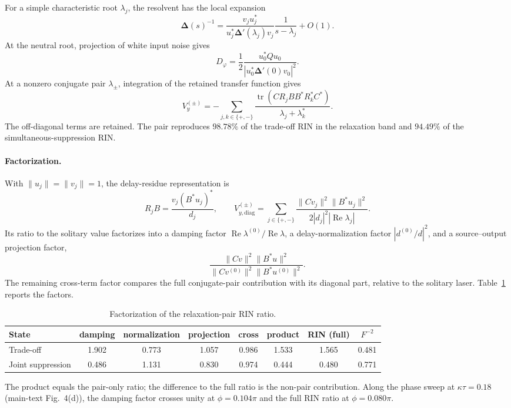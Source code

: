 \documentclass[11pt]{article}
\newcommand{\Dmat}{\bm{\Delta}}
\newcommand{\Tr}{\operatorname{tr}}
\newif\ifmarked
\newenvironment{revised}{\ifmarked\color{blue}\fi}{}
\begin{document}
For a simple characteristic root $\lambda_j$, the resolvent has the local expansion
\begin{equation}
\Dmat(s)^{-1}=\frac{v_ju_j^*}{u_j^*\Dmat'(\lambda_j)v_j}\frac{1}{s-\lambda_j}+O(1).
\end{equation}
At the neutral root, projection of white input noise gives
\begin{equation}
D_\varphi=\frac12\frac{u_0^*Qu_0}{|u_0^*\Dmat'(0)v_0|^2}.
\end{equation}
At a nonzero conjugate pair $\lambda_\pm$, integration of the retained transfer function gives
\begin{equation}
V_y^{(\pm)}=-\sum_{j,k\in\{+,-\}}
\frac{\Tr(CR_jBB^*R_k^*C^*)}{\lambda_j+\lambda_k^*}.
\end{equation}
The off-diagonal terms are retained. The pair reproduces $98.78\%$ of the trade-off RIN in the relaxation band and $94.49\%$ of the simultaneous-suppression RIN.

\begin{revised}
\paragraph{Factorization.}
With $\|u_j\|=\|v_j\|=1$, the delay-residue representation is
\begin{equation}
R_jB=\frac{v_j(B^*u_j)^*}{d_j},\qquad
V_{y,\mathrm{diag}}^{(\pm)}=
\sum_{j\in\{+,-\}}\frac{\|Cv_j\|^2\|B^*u_j\|^2}
{2|d_j|^2|\operatorname{Re}\lambda_j|}.
\end{equation}
Its ratio to the solitary value factorizes into a damping factor
$\operatorname{Re}\lambda^{(0)}/\operatorname{Re}\lambda$,
a delay-normalization factor $|d^{(0)}/d|^2$, and a source--output projection factor,
\begin{equation}
\frac{\|Cv\|^2\|B^*u\|^2}
{\|Cv^{(0)}\|^2\|B^*u^{(0)}\|^2}.
\end{equation}
The remaining cross-term factor compares the full conjugate-pair contribution with its
diagonal part, relative to the solitary laser. Table~\ref{tab:mech} reports the factors.

\begin{table}[h]
\centering
\caption{Factorization of the relaxation-pair RIN ratio.}
\label{tab:mech}
\small
\setlength{\tabcolsep}{3.5pt}
\begin{tabular}{lccccccc}
\toprule
State & damping & normalization & projection & cross & product & RIN (full) & $F^{-2}$\\
\midrule
Trade-off & 1.902 & 0.773 & 1.057 & 0.986 & 1.533 & 1.565 & 0.481\\
Joint suppression & 0.486 & 1.131 & 0.830 & 0.974 & 0.444 & 0.480 & 0.771\\
\bottomrule
\end{tabular}
\end{table}
The product equals the pair-only ratio; the difference to the full ratio is the non-pair contribution. Along the phase sweep at $\kappa\tau=0.18$ (main-text Fig.~4(d)), the damping factor crosses unity at $\phi=0.104\pi$ and the full RIN ratio at $\phi=0.080\pi$.\end{revised}
\end{document}
